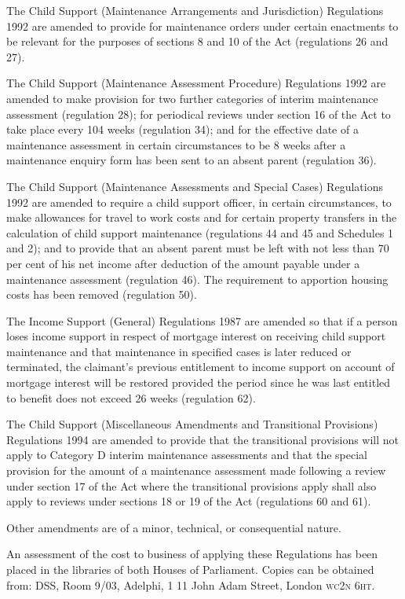 \documentclass[12pt,a4paper]{article}
\begin{document}
  The Child Support (Maintenance Arrangements and Jurisdiction) Regulations 1992 are amended to provide for maintenance orders under certain enactments to be relevant for the purposes of sections 8 and 10 of the Act (regulations 26 and 27).

  The Child Support (Maintenance Assessment Procedure) Regulations 1992 are amended to make provision for two further categories of interim maintenance assessment (regulation 28); for periodical reviews under section 16 of the Act to take place every 104 weeks (regulation 34); and for the effective date of a maintenance assessment in certain circumstances to be 8 weeks after a maintenance enquiry form has been sent to an absent parent (regulation 36).

  The Child Support (Maintenance Assessments and Special Cases) Regulations 1992 are amended to require a child support officer, in certain circumstances, to make allowances for travel to work costs and for certain property transfers in the calculation of child support maintenance (regulations 44 and 45 and Schedules 1 and 2); and to provide that an absent parent must be left with not less than 70 per cent of his net income after deduction of the amount payable under a maintenance assessment (regulation 46). The requirement to apportion housing costs has been removed (regulation 50).

  The Income Support (General) Regulations 1987 are amended so that if a person loses income support in respect of mortgage interest on receiving child support maintenance and that maintenance in specified cases is later reduced or terminated, the claimant’s previous entitlement to income support on account of mortgage interest will be restored provided the period since he was last entitled to benefit does not exceed 26 weeks (regulation 62).

  The Child Support (Miscellaneous Amendments and Transitional Provisions) Regulations 1994 are amended to provide that the transitional provisions will not apply to Category D interim maintenance assessments and that the special provision for the amount of a maintenance assessment made following a review under section 17 of the Act where the transitional provisions apply shall also apply to reviews under sections 18 or 19 of the Act (regulations 60 and 61).

  Other amendments are of a minor, technical, or consequential nature.

  An assessment of the cost to business of applying these Regulations has been placed in the libraries of both Houses of Parliament. Copies can be obtained from: DSS, Room 9/03, Adelphi, 1 11 John Adam Street, London \textsc{\lowercase{WC2N 6HT}}.
\end{document}
